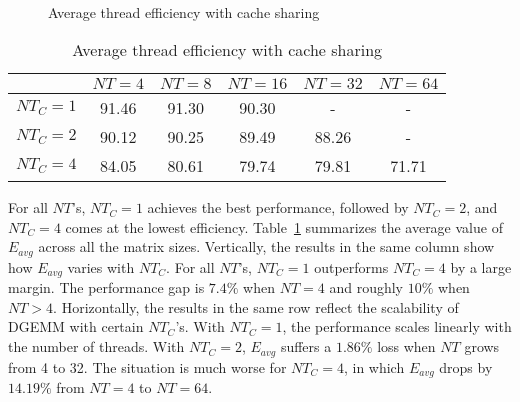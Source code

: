 \begin{figure}
  \centering
  \\
  \caption{Average thread efficiency with cache sharing}
  \label{fig:drawback}
\end{figure}

\begin{table}
  \centering
  \caption{Average thread efficiency with cache sharing}
  \label{tab:drawback}
  \begin{tabular}{cccccc}
    \toprule
     & $NT=4$ & $NT=8$ & $NT=16$ & $NT=32$ & $NT=64$ \\
    \midrule
    $NT_C=1$ & 91.46 & 91.30 & 90.30 & -     & - \\   
    $NT_C=2$ & 90.12 & 90.25 & 89.49 & 88.26 & - \\
    $NT_C=4$ & 84.05 & 80.61 & 79.74 & 79.81 & 71.71 \\
    \bottomrule
  \end{tabular}
\end{table}

For all $NT$'s, $NT_C=1$ achieves the 
best performance, followed by 
$NT_C=2$, and $NT_C=4$ comes at the lowest efficiency.
Table~\ref{tab:drawback} summarizes the average value
of $E_{avg}$ across all the matrix sizes.
Vertically, the results in the same column show how $E_{avg}$ varies with $NT_C$.
For all $NT$'s, $NT_C=1$ outperforms $NT_C=4$ by a large margin.
The performance gap is $7.4\%$ when $NT=4$ and roughly $10\%$ when $NT>4$.
Horizontally,  the results in the same row reflect the scalability of
DGEMM with certain $NT_C$'s.
With $NT_C=1$, the performance scales linearly with the number of threads.
With $NT_C=2$, $E_{avg}$ suffers a $1.86\%$ loss when $NT$ grows from 4 to 32.
The situation is much worse for $NT_C=4$, in which
$E_{avg}$ drops by $14.19\%$ from
$NT=4$ to $NT=64$.

